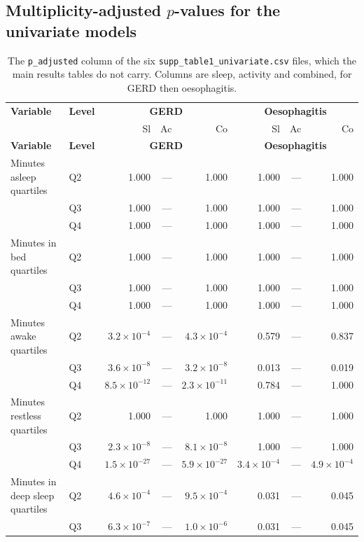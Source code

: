 \documentclass[11pt]{article}
\newcommand{\code}[1]{\texttt{\small #1}}
\begin{document}
\subsection{Multiplicity-adjusted $p$-values for the univariate models}
\footnotesize\begin{longtable}{@{}p{4.0cm}p{2.6cm}rrrrrr@{}}
\caption{The \code{p\_adjusted} column of the six \code{supp\_table1\_univariate.csv} files, which the main results tables do not carry. Columns are sleep, activity and combined, for GERD then oesophagitis.}\label{tab:appM-univp}\\
\toprule \textbf{Variable} & \textbf{Level} & \multicolumn{3}{c}{\textbf{GERD}} & \multicolumn{3}{c}{\textbf{Oesophagitis}} \\
 & & Sl & Ac & Co & Sl & Ac & Co \\ \midrule \endfirsthead
\toprule \textbf{Variable} & \textbf{Level} & \multicolumn{3}{c}{\textbf{GERD}} & \multicolumn{3}{c}{\textbf{Oesophagitis}} \\ \midrule \endhead
Minutes asleep quartiles & Q2 & 1.000 & --- & 1.000 & 1.000 & --- & 1.000 \\
 & Q3 & 1.000 & --- & 1.000 & 1.000 & --- & 1.000 \\
 & Q4 & 1.000 & --- & 1.000 & 1.000 & --- & 1.000 \\
Minutes in bed quartiles & Q2 & 1.000 & --- & 1.000 & 1.000 & --- & 1.000 \\
 & Q3 & 1.000 & --- & 1.000 & 1.000 & --- & 1.000 \\
 & Q4 & 1.000 & --- & 1.000 & 1.000 & --- & 1.000 \\
Minutes awake quartiles & Q2 & $3.2\times10^{-4}$ & --- & $4.3\times10^{-4}$ & 0.579 & --- & 0.837 \\
 & Q3 & $3.6\times10^{-8}$ & --- & $3.2\times10^{-8}$ & 0.013 & --- & 0.019 \\
 & Q4 & $8.5\times10^{-12}$ & --- & $2.3\times10^{-11}$ & 0.784 & --- & 1.000 \\
Minutes restless quartiles & Q2 & 1.000 & --- & 1.000 & 1.000 & --- & 1.000 \\
 & Q3 & $2.3\times10^{-8}$ & --- & $8.1\times10^{-8}$ & 1.000 & --- & 1.000 \\
 & Q4 & $1.5\times10^{-27}$ & --- & $5.9\times10^{-27}$ & $3.4\times10^{-4}$ & --- & $4.9\times10^{-4}$ \\
Minutes in deep sleep quartiles & Q2 & $4.6\times10^{-4}$ & --- & $9.5\times10^{-4}$ & 0.031 & --- & 0.045 \\
 & Q3 & $6.3\times10^{-7}$ & --- & $1.0\times10^{-6}$ & 0.031 & --- & 0.045 \\

\end{longtable}
\end{document}
